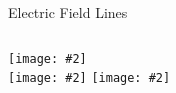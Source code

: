 \documentclass[12pt,aspectratio=169]{beamer}
\newcommand{\pic}[2]{\texttt{[image: \#2]}}
\newcommand{\mb}[1]{\mathbf{#1}}
\newcommand{\eq}[2]{\vspace{#1}{
    \Large\begin{displaymath}#2\end{displaymath}}
}
\begin{document}
\begin{frame}{Electric Field Lines}
  \begin{columns}
    \pic{.95}{pos_charge.png}\\
    \pic{.95}{neg_charge.png}
    \pic{.95}{2charges.png}
  \end{columns}
\end{frame}



%
%
%
%
%
%
%  
%
%
%
%
\end{document}
